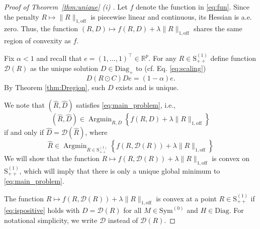 \documentclass[12pt]{amsart}
\numberwithin{equation}{section}
\numberwithin{equation}{section}
\theoremstyle{plain}
\theoremstyle{definition}
\DeclareMathOperator*{\Argmin}{\mathrm{Arg}\min}
\newcommand{\Sppone}{\mathrm{S}_{++}^{(1)}}
\newcommand{\Szero}{\mathrm{Sym}^{(0)}}
\newcommand{\R}{\mathbb{R}}
\newcommand{\Diag}{\mathrm{Diag}}
\newcommand{\Diagp}{\mathrm{Diag}_+}
\newcommand{\D}{\mathcal{D}}
\begin{document}
\begin{proof}[Proof of Theorem~\ref{thm:unique} (i) ]
Let $f$ denote the function in \eqref{eq:fun}. Since the penalty $R\mapsto \|R\|_{1,\mathrm{off}}$ is piecewise linear and continuous, its Hessian is a.e. zero. Thus, the function $(R,D)\mapsto f(R,D)+\lambda \|R\|_{1,\mathrm{off}}$ shares the same region of convexity as $f$.

Fix $\alpha<1$ and recall that $e=(1,\ldots,1)^\top\in\R^p$. For any $R\in\Sppone$ define function $\D(R)$ as the unique solution $D\in\Diagp$ to (cf. Eq. \eqref{eq:scaling})
\[
D \left( R\odot C \right) D e = (1-\alpha) e.
\]
By Theorem \ref{thm:Dregion}, such $D$ exists and is unique. 

We note that $(\hat{R},\hat{D})$ satisfies \eqref{eq:main_problem}, i.e.,
\[
(\hat{R},\hat{D}) \in\Argmin_{R,D} \left\{ f(R,D)+\lambda \|R\|_{1,\mathrm{off}} \right\}
\]
if and only if $\hat{D} = \D(\hat{R})$, where 
\[
\hat{R} \in\Argmin_{R\in \Sppone}\left\{ f(R, \D(R)) + \lambda\|R\|_{1,\mathrm{off}}\right\}
\]
We will show that the function $R\mapsto f(R,\D(R))+\lambda\|R\|_{1,\mathrm{off}}$ is convex on $\Sppone$, which will imply that there is only a unique global minimum to \eqref{eq:main_problem}.

The function $R\mapsto f(R,\D(R))+\lambda\|R\|_{1,\mathrm{off}}$ is convex at a point $R\in\Sppone$ if \eqref{eq:ispositive} holds with $D=\D(R)$ for all $M\in \Szero$ and $H\in\Diag$. For notational simplicity, we write $\D$ instead of $\D(R)$.


\end{proof}
\end{document}
